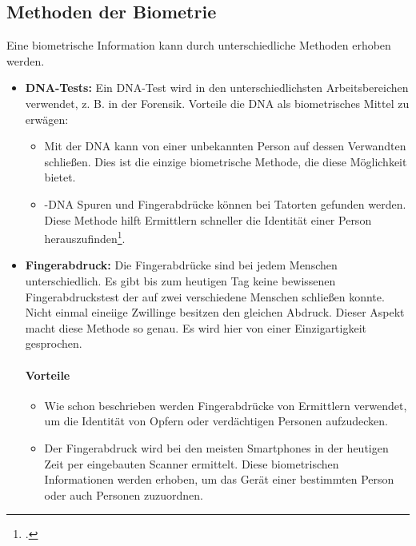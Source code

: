 \subsection{Methoden der Biometrie}
Eine biometrische Information kann durch unterschiedliche Methoden erhoben werden.
\begin{itemize}
	\item \textbf{DNA-Tests:} Ein DNA-Test wird in den unterschiedlichsten Arbeitsbereichen verwendet, z. B. in der Forensik.
	Vorteile die DNA als biometrisches Mittel zu erwägen:
	\begin{itemize}
		\item Mit der DNA kann von einer unbekannten Person auf dessen Verwandten schließen. Dies ist die einzige biometrische Methode, die diese Möglichkeit bietet.
		\item-DNA Spuren und Fingerabdrücke können bei Tatorten gefunden werden. Diese Methode hilft Ermittlern schneller die Identität einer Person herauszufinden\footcite{dna-test}.
	\end{itemize}
	\item \textbf{Fingerabdruck:} Die Fingerabdrücke sind bei jedem Menschen unterschiedlich. 
	Es gibt bis zum heutigen Tag keine bewissenen Fingerabdruckstest der auf zwei verschiedene Menschen schließen konnte. 
	Nicht einmal eineiige Zwillinge besitzen den gleichen Abdruck.
	Dieser Aspekt macht diese Methode so genau. Es wird hier von einer Einzigartigkeit gesprochen.
	\paragraph{Vorteile}
	\begin{itemize}
		\item Wie schon beschrieben werden Fingerabdrücke von Ermittlern verwendet, um die Identität von Opfern oder verdächtigen Personen aufzudecken.
		\item Der Fingerabdruck wird bei den meisten Smartphones in der heutigen Zeit per eingebauten Scanner ermittelt. Diese biometrischen Informationen werden erhoben, um das Gerät einer bestimmten Person oder auch Personen zuzuordnen.
	\end{itemize}

\end{itemize}
